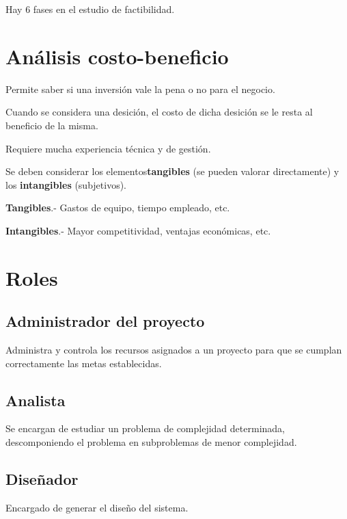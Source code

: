 \documentclass{article}
\begin{document}
\vspace{1em}
Hay 6 fases en el estudio de factibilidad.

\section{Análisis costo-beneficio}

Permite saber si una inversión vale la pena o no para el negocio.

\vspace{1em}
Cuando se considera una desición, el costo de dicha desición se le resta al
beneficio de la misma.

\vspace{1em}
Requiere mucha experiencia técnica y de gestión.

\vspace{1em}
Se deben considerar los elementos\textbf{tangibles} (se pueden valorar directamente)
y los \textbf{intangibles} (subjetivos).

\vspace{1em}
\textbf{Tangibles}.- Gastos de equipo, tiempo empleado, etc.

\vspace{1em}
\textbf{Intangibles}.- Mayor competitividad, ventajas económicas, etc.

\section{Roles}

\subsection{Administrador del proyecto}

Administra y controla los recursos asignados a un proyecto para que se cumplan
correctamente las metas establecidas.

\subsection{Analista}

Se encargan de estudiar un problema de complejidad determinada, descomponiendo
el problema en subproblemas de menor complejidad.

\subsection{Diseñador}

Encargado de generar el diseño del sistema.
\end{document}
